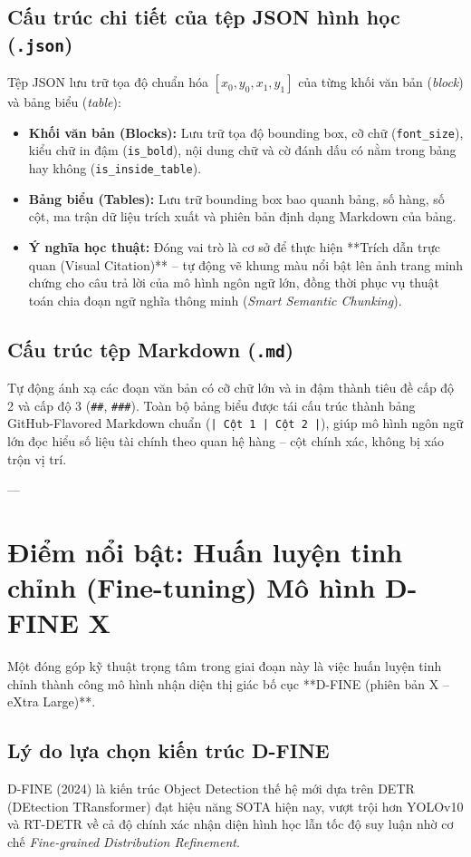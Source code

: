 \documentclass[a4paper,12pt]{article}
\begin{document}
\subsection{Cấu trúc chi tiết của tệp JSON hình học (\texttt{.json})}
Tệp JSON lưu trữ tọa độ chuẩn hóa $[x_0, y_0, x_1, y_1]$ của từng khối văn bản (\textit{block}) và bảng biểu (\textit{table}):
\begin{itemize}
    \item \textbf{Khối văn bản (Blocks):} Lưu trữ tọa độ bounding box, cỡ chữ (\texttt{font\_size}), kiểu chữ in đậm (\texttt{is\_bold}), nội dung chữ và cờ đánh dấu có nằm trong bảng hay không (\texttt{is\_inside\_table}).
    \item \textbf{Bảng biểu (Tables):} Lưu trữ bounding box bao quanh bảng, số hàng, số cột, ma trận dữ liệu trích xuất và phiên bản định dạng Markdown của bảng.
    \item \textbf{Ý nghĩa học thuật:} Đóng vai trò là cơ sở để thực hiện **Trích dẫn trực quan (Visual Citation)** -- tự động vẽ khung màu nổi bật lên ảnh trang minh chứng cho câu trả lời của mô hình ngôn ngữ lớn, đồng thời phục vụ thuật toán chia đoạn ngữ nghĩa thông minh (\textit{Smart Semantic Chunking}).
\end{itemize}

\subsection{Cấu trúc tệp Markdown (\texttt{.md})}
Tự động ánh xạ các đoạn văn bản có cỡ chữ lớn và in đậm thành tiêu đề cấp độ 2 và cấp độ 3 (\texttt{\#\#}, \texttt{\#\#\#}). Toàn bộ bảng biểu được tái cấu trúc thành bảng GitHub-Flavored Markdown chuẩn (\texttt{| Cột 1 | Cột 2 |}), giúp mô hình ngôn ngữ lớn đọc hiểu số liệu tài chính theo quan hệ hàng -- cột chính xác, không bị xáo trộn vị trí.

---

\section{Điểm nổi bật: Huấn luyện tinh chỉnh (Fine-tuning) Mô hình D-FINE X}

Một đóng góp kỹ thuật trọng tâm trong giai đoạn này là việc huấn luyện tinh chỉnh thành công mô hình nhận diện thị giác bố cục **D-FINE (phiên bản X -- eXtra Large)**.

\subsection{Lý do lựa chọn kiến trúc D-FINE}
D-FINE (2024) là kiến trúc Object Detection thế hệ mới dựa trên DETR (DEtection TRansformer) đạt hiệu năng SOTA hiện nay, vượt trội hơn YOLOv10 và RT-DETR về cả độ chính xác nhận diện hình học lẫn tốc độ suy luận nhờ cơ chế \textit{Fine-grained Distribution Refinement}.
\end{document}
